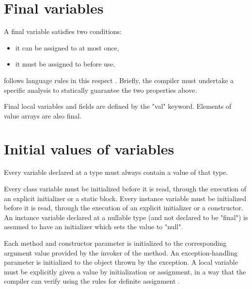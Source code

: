 \section{Final variables}\label{FinalVariable}
A final variable satisfies two conditions: 
\begin{itemize}
\item it can be assigned to at most once, 
\item it must be assigned to before use. 
\end{itemize}

\Xten{} follows \java{} language rules in this respect \cite[\S
4.5.4,8.3.1.2,16]{jls2}. Briefly, the compiler must undertake a
specific analysis to statically guarantee the two properties above.

Final local variables and fields are defined by the \xcd"val"
keyword.  Elements of value arrays are also final.


\section{Initial values of variables}
\label{NullaryConstructor}

Every variable declared at a type must always contain a value of that type.

Every class variable must be initialized before it is read, through
the execution of an explicit initializer or a static block. Every
instance variable must be initialized before it is read, through the
execution of an explicit initializer or a constructor.  An instance
variable declared at a nullable type (and not declared to be
\xcd"final") is assumed to have an initializer which sets the value to
\xcd"null".

Each method and constructor parameter is initialized to the
corresponding argument value provided by the invoker of the method. An
exception-handling parameter is initialized to the object thrown by
the exception. A local variable must be explicitly given a value by
initialization or assignment, in a way that the compiler can verify
using the rules for definite assignment \cite[\S~16]{jls2}.

